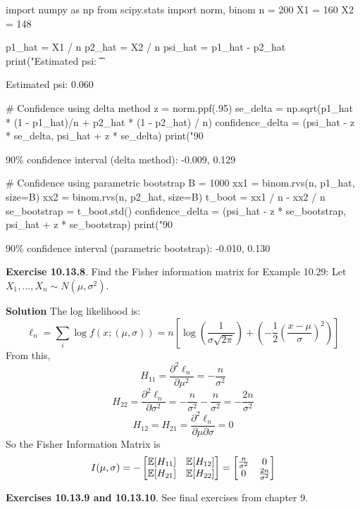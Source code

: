 \begin{python}
import numpy as np
from scipy.stats import norm, binom
n = 200
X1 = 160
X2 = 148
\end{python}

\begin{python}
p1_hat = X1 / n
p2_hat = X2 / n
psi_hat = p1_hat - p2_hat
print("Estimated psi: \t %
\end{python}
\begin{console}
Estimated psi:   0.060
\end{console}

\begin{python}
# Confidence using delta method
z = norm.ppf(.95)
se_delta = np.sqrt(p1_hat * (1 - p1_hat)/n + p2_hat * (1 - p2_hat) / n)
confidence_delta = (psi_hat - z * se_delta, psi_hat + z * se_delta)
print("90%
\end{python}
\begin{console}
90\% confidence interval (delta method):          -0.009, 0.129
\end{console}

\begin{python}
# Confidence using parametric bootstrap
B = 1000
xx1 = binom.rvs(n, p1_hat, size=B)
xx2 = binom.rvs(n, p2_hat, size=B)
t_boot = xx1 / n - xx2 / n
se_bootstrap = t_boot.std()
confidence_delta = (psi_hat - z * se_bootstrap, psi_hat + z * se_bootstrap)
print("90%
\end{python}
\begin{console}
90\% confidence interval (parametric bootstrap):          -0.010, 0.130
\end{console}

\textbf{Exercise 10.13.8}. Find the Fisher information matrix for
Example 10.29:
Let \(X_{1}, \dots, X_{n} \sim N(\mu, \sigma^{2})\).

\textbf{Solution} The log likelihood is:
\[
\ell_{n} = \sum_{i} \log f(x; (\mu, \sigma))
= n \left[ \log \left( \frac{1}{\sigma \sqrt{2 \pi}} \right) + \left( -\frac{1}{2} \left(\frac{x - \mu}{\sigma} \right)^{2}\right) \right]
\]
From this,
\[
H_{11} = \frac{\partial^{2} \ell_{n}}{\partial \mu^{2}} = -\frac{n}{\sigma^{2}}
\]
\[
H_{22} = \frac{\partial^{2} \ell_{n}}{\partial \sigma^{2}} = -\frac{n}{\sigma^{2}} - \frac{n}{\sigma^{2}} = -\frac{2n}{\sigma^{2}}
\]
\[
H_{12} = H_{21} = \frac{\partial^{2} \ell_{n}}{\partial \mu \partial \sigma} = 0
\]
So the Fisher Information Matrix is
\[
I(\mu, \sigma) = -\begin{bmatrix}
\operatorname{\mathbb{E}}[H_{11}] & \operatorname{\mathbb{E}}[H_{12}] \\
\operatorname{\mathbb{E}}[H_{21}] & \operatorname{\mathbb{E}}[H_{22}]
\end{bmatrix} = \begin{bmatrix}
\frac{n}{\sigma^{2}} & 0 \\
0 & \frac{2n}{\sigma^{2}}
\end{bmatrix}
\]

\textbf{Exercises 10.13.9 and 10.13.10}. See final exercises from
chapter 9.
